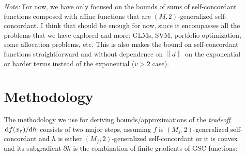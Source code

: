 \documentclass[11pt]{article}
\theoremstyle{definition}
\theoremstyle{remark}
\theoremstyle{plain}
\theoremstyle{definition}
\newcommand{\norm}[1]{\left\lVert #1 \right\rVert}
\newcommand{\1}{\mathbf{1}}
\begin{document}
\begin{itemize}
\begin{itemize}


\end{itemize}

\end{itemize}


{\color{red} \textit{Note:} For now, we have only focused on the bounds of sums of self-concordant functions composed with affine functions that are $(M,2)$-generalized self-concordant. I think that should be enough for now, since it encompasses all the problems that we have explored and more: GLMs, SVM, portfolio optimization, some allocation problems, etc. This is also makes the bound on self-concordant functions straightforward and without dependence on $\norm{d}$ on the exponential or harder terms instead of the exponential ($v>2$ case).}

\section{Methodology}

The methodology we use for deriving bounds/approximations of the \textit{tradeoff} $\odv{f(x_\tau)}/{h}$ consists of two major steps, assuming $f$ is $(M_f, 2)$-generalized self-concordant and $h$ is either $(M_f, 2)$-generalized self-concordant or it is convex and its subgradient $\partial h$ is the combination of finite gradients of GSC functions:
\end{document}

